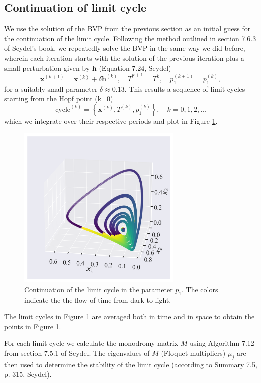\subsection{Continuation of limit cycle}
We use the solution of the BVP from the previous section as an initial guess for the continuation of the limit cycle.
Following the method outlined in section 7.6.3 of Seydel's book, we repeatedly solve the BVP in the same way we did before, wherein each 
iteration starts with the solution of the previous iteration plus a small perturbation given 
by $\mathbf{h}$ (Equation 7.24, Seydel)
\[
    \bar{\mathbf{x}}^{(k+1)} = \mathbf{x}^{(k)} + \delta \mathbf{h}^{(k)}, \quad \bar{T}^{k+1} = T^{k}, \quad \bar{p}_1^{(k+1)} = p_1^{(k)},
\]
for a suitably small parameter $\delta \approx 0.13$. This results a sequence of limit cycles starting from the Hopf point (k=0)
\[
    \textrm{cycle}^{(k)} = \left\{\mathbf{x}^{(k)}, T^{(k)}, p_1^{(k)} \right\}, \quad k = 0, 1, 2, \ldots
\]
which we integrate over their respective periods and plot in Figure \ref{fig:mcm_limit_cycle_continuation}.
\begin{figure}[H]
    \centering
    \includegraphics[width=0.7\textwidth]{figures/mcm_limit_cycles2.png}
    \caption{Continuation of the limit cycle in the parameter $p_1$. The colors indicate the the flow of time
    from dark to light.}
    \label{fig:mcm_limit_cycle_continuation}
\end{figure}
The limit cycles in Figure \ref{fig:mcm_limit_cycle_continuation} are averaged both in time and in space to obtain the points in 
Figure \ref{fig:mcm_limit_cycle_continuation}.

For each limit cycle we calculate the monodromy matrix $M$ using Algorithm 7.12
from section 7.5.1 of Seydel. The eigenvalues of $M$ (Floquet multipliers) $\mu_j$ are then used to determine the stability of the limit cycle
(according to Summary 7.5, p. 315, Seydel).

